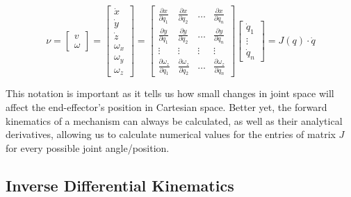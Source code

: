 \begin{equation}\label{eq:kinematics:diff:fwd}
\nu = \left[\begin{array}{c}v\\\omega\end{array}\right]=
\left[\begin{array}{c}\dot{x}\\
\dot{y}\\
\dot{z}\\
\omega_x\\
\omega_y\\
\omega_z\end{array}\right]=
\left[\begin{array}{cccc}\frac{\partial{x}}{\partial{q_1}} & \frac{\partial{x}}{\partial{q_2}} & \ldots & \frac{\partial{x}}{\partial{q_n}}\\\frac{\partial{y}}{\partial{q_1}} & \frac{\partial{y}}{\partial{q_2}} & \ldots & \frac{\partial{y}}{\partial{q_n}}\\\vdots & \vdots & \vdots & \vdots\\\frac{\partial{\omega_z}}{\partial{q_1}} & \frac{\partial{\omega_z}}{\partial{q_2}} & \ldots & \frac{\partial{\omega_z}}{\partial{q_n}}\end{array}\right]\left[\begin{array}{c}\dot{q}_1\\\vdots\\\dot{q}_n\end{array}\right] = J (q) \cdot \dot{q}
\end{equation}

This notation is important as it tells us how small changes in joint space will affect the end-effector's position in Cartesian space. Better yet, the forward kinematics of a mechanism can always be calculated, as well as their analytical derivatives, allowing us to calculate numerical values for the entries of matrix $J$ for every possible joint angle/position.

\subsection{Inverse Differential Kinematics}\label{sec:kinematics:diff:inv}


